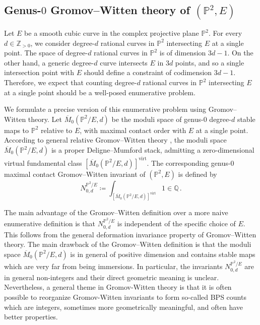\documentclass[11pt,letterpaper]{amsart}
\newcommand\PP{\mathbb P}
\newcommand\Q{\mathbb Q}
\newcommand\Z{\mathbb Z}
\newcommand\virt{\mathrm{virt}}
\begin{document}
\subsection{Genus-$0$ Gromov--Witten theory of $(\PP^2,E)$}
\label{section_relative_GW}

Let $E$ be a smooth cubic curve in the complex projective plane 
$\PP^2$. For every $d \in \Z_{>0}$, we consider 
degree-$d$ rational curves in $\PP^2$ intersecting 
$E$ at a single point. The space of degree-$d$ rational curves in $\PP^2$ is of dimension $3d-1$. 
On the other hand, a generic degree-$d$ curve intersects $E$ in $3d$ points, and so a single intersection point with $E$ should define a constraint of codimension $3d-1$. 
Therefore, we expect that counting degree-$d$ rational curves in $\PP^2$ intersecting $E$ at a single point should be a well-posed enumerative problem. 

We formulate a precise version of this enumerative problem using Gromov--Witten theory. Let 
$\overline{M}_{0}(\PP^2/E,d)$ be the moduli space of 
genus-$0$ degree-$d$ stable maps to $\PP^2$ relative to $E$,
with maximal contact order with $E$ at a single point.
According to general relative Gromov--Witten theory
\cite{MR1882667, MR1938113}, the moduli space $\overline{M}_{0}(\PP^2/E,d)$ is a proper Deligne--Mumford stack, admitting a zero-dimensional
virtual fundamental class $[\overline{M}_{0}(\PP^2/E,d)]^{\virt}$.
The corresponding genus-$0$ maximal contact Gromov--Witten invariant of $(\PP^2,E)$ is defined by
\[N_{0,d}^{\PP^2/E} \coloneq \int_{[\overline{M}_{0}(\PP^2/E,d)]^{\virt}} 1 \in \Q \,.\]
 

The main advantage of the Gromov--Witten definition over a more naive enumerative definition is that $N_{0,d}^{\PP^2/E}$ is independent of the specific choice of $E$. This follows from the general deformation invariance property of Gromov--Witten theory. The main drawback of the Gromov--Witten definition is that the moduli space $\overline{M}_{0}(\PP^2/E,d)$ is in general of positive dimension and contains stable maps which are very far from being immersions. 
In particular, the invariants 
$N_{0,d}^{\PP^2/E}$ are in general non-integers and their direct geometric meaning is unclear. Nevertheless, a general theme in Gromov-Witten theory is that it is often possible to reorganize Gromov-Witten invariants to form so-called BPS counts which are integers, sometimes more geometrically meaningful, and often have better properties.
\end{document}
